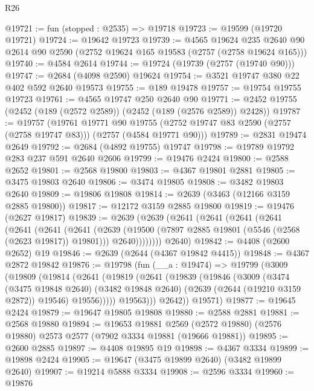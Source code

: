 \begin{lexlean}{R26}
\begin{coremodule}
@19721 := fun (stopped : @2535) => @19718
@19723 := @19599 (@19720 @19721)
@19724 := @19642 @19723
@19739 := @4565
    @19624
    @235
    @2640
    @90
    @2614
    @90
    @2590
    (@2752 @19624 @165 @19583 (@2757 (@2758 @19624 @165)))
@19740 := @4584 @2614
@19744 := @19724 (@19739 (@2757 (@19740 @90)))
@19747 := @2684 (@4098 @2590) @19624
@19754 := @3521 @19747 @380 @22 @402 @592 @2640 @19573
@19755 := @189 @19478
@19757 := @19754 @19755 @19723
@19761 := @4565 @19747 @250 @2640 @90
@19771 := @2452 @19755 (@2452 (@189 (@2572 @2589)) (@2452 (@189 (@2576 @2589)) @2428))
@19787 := @19757
    (@19761
      @19771
      @90
      @19755
      (@2752 @19747 @83 @2590 (@2757 (@2758 @19747 @83)))
      (@2757 (@4584 @19771 @90)))
@19789 := @2831 @19474 @2649
@19792 := @2684 (@4892 @19755) @19747
@19798 := @19789 @19792 @283 @237 @591 @2640 @2606
@19799 := @19476 @2424
@19800 := @2588 @2652
@19801 := @2568 @19800
@19803 := @4367 @19801 @2881
@19805 := @3475 @19803 @2640
@19806 := @3474 @19805
@19808 := @3482 @19803 @2640
@19809 := @19806 @19808
@19814 := @2639 (@3463 (@12166 @3159 @2885 @19800))
@19817 := @12172 @3159 @2885 @19800
@19819 := @19476 (@2627 @19817)
@19839 := @2639
    (@2639
      (@2641
        (@2641
          (@2641
            (@2641
              (@2641
                (@2641
                  (@2641
                    (@2639
                      (@19500 (@7897 @2885 @19801 (@5546 (@2568 (@2623 @19817)) @19801)))
                      @2640))))))))
      @2640)
@19842 := @4408 (@2600 @2652) @19
@19846 := @2639 (@2644 (@4367 @19842 @4415))
@19848 := @4367 @2872 @19842
@19876 := @19798
    (fun (__a : @19474) =>
    @19799
      (@3009
        (@19809
          (@19814
            (@2641
              (@19819
                (@2641
                  (@19839
                    (@19846
                      (@3009
                        (@3474
                          (@3475 @19848 @2640)
                          (@3482 @19848 @2640)
                          (@2639 (@2644 (@19210 @3159 @2872)) @19546)
                          @19556)))))
                @19563)))
          @2642))
      @19571)
@19877 := @19645 @2424
@19879 := @19647 @19805 @19808
@19880 := @2588 @2881
@19881 := @2568 @19880
@19894 := @19653
    @19881
    @2569
    (@2572 @19880)
    (@2576 @19880)
    @2573
    @2577
    (@7902 @3334 @19881 (@19666 @19881))
@19895 := @2600 @2885
@19897 := @4408 @19895 @19
@19898 := @4367 @3334
@19899 := @19898 @2424
@19905 := @19647 (@3475 @19899 @2640) (@3482 @19899 @2640)
@19907 := @19214 @5888 @3334
@19908 := @2596 @3334
@19960 := @19876

\end{coremodule}
\end{lexlean}
